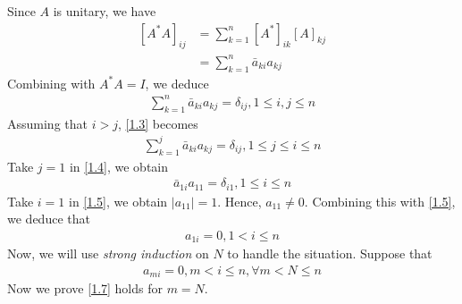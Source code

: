 \documentclass[a4paper,oneside]{book}
\numberwithin{equation}{chapter}
\begin{document}
Since $A$ is unitary, we have
\begin{align}
{\left[ {{A^*}A} \right]_{ij}} &= \sum\limits_{k = 1}^n {{{\left[ {{A^*}} \right]}_{ik}}{{\left[ A \right]}_{kj}}} \\
 &= \sum\limits_{k = 1}^n {{{\bar a}_{ki}}{a_{kj}}} 
\end{align}
Combining with $A^*A = I$, we deduce
\begin{align}
\label{1.3}
\sum\limits_{k = 1}^n {{{\bar a}_{ki}}{a_{kj}}}  = {\delta _{ij}},1 \le i,j \le n
\end{align}
Assuming that $i>j$, \eqref{1.3} becomes
\begin{align}
\label{1.4}
\sum\limits_{k = 1}^j {{{\bar a}_{ki}}{a_{kj}}}  = {\delta _{ij}},1 \le j \le i \le n
\end{align}
Take $j=1$ in \eqref{1.4}, we obtain
\begin{align}
\label{1.5}
{{\bar a}_{1i}}{a_{11}} = {\delta _{i1}},1 \le i \le n
\end{align}
Take $i=1$ in \eqref{1.5}, we obtain $\left| {{a_{11}}} \right| = 1$. Hence, ${a_{11}} \ne 0$. Combining this with \eqref{1.5}, we deduce that
\begin{align}
{a_{1i}} = 0,1 < i \le n
\end{align}
Now, we will use \textit{strong induction} on $N$ to handle the situation. Suppose that 
\begin{align}
\label{1.7}
{a_{mi}} = 0,m < i \le n,\forall m < N \le n
\end{align}
Now we prove \eqref{1.7} holds for $m=N$. 
\end{document}
